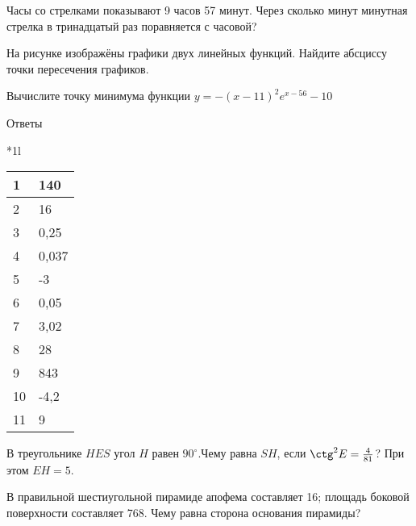 \documentclass[twocolumn]{article}
\begin{document}
\begin{taskBN}{9}
Часы со стрелками показывают 9 часов 57 минут. Через сколько минут минутная стрелка в тринадцатый раз поравняется с часовой?
\end{taskBN}

\begin{taskBN}{10}
На рисунке изображёны графики двух линейных функций. Найдите абсциссу точки пересечения графиков.\vspace{2.5cm}
\end{taskBN}

\begin{taskBN}{11}
Вычислите точку минимума функции $y = -(x-11)^{2}e^{x-56}-10$
\end{taskBN}

\newpage
 Ответы


\begin{tabular}{*{1}l}
\begin{tabular}[t]{|l|l|}
\hline
1 & 140\\
\hline
2 & 16\\
\hline
3 & 0,25\\
\hline
4 & 0,037\\
\hline
5 & -3\\
\hline
6 & 0,05\\
\hline
7 & 3,02\\
\hline
8 & 28\\
\hline
9 & 843\\
\hline
10 & -4,2\\
\hline
11 & 9\\
\hline
\end{tabular}\end{tabular}



\newpage




\cleardoublepage
\def\examvart{Вариант 19.3}
\normalsize

\startpartone
\large




\begin{taskBN}{1}
В треугольнике $HES$ угол $H$ равен $90^\circ$.Чему равна  $SH$, если $\ctg^2{E}=\frac{4}{81}$? При этом  $EH=5$. 
\end{taskBN}

\begin{taskBN}{2}
В правильной шестиугольной пирамиде апофема составляет 16; площадь боковой поверхности составляет 768. Чему равна сторона основания пирамиды?\vspace{2.5cm}
\end{taskBN}
\end{document}

